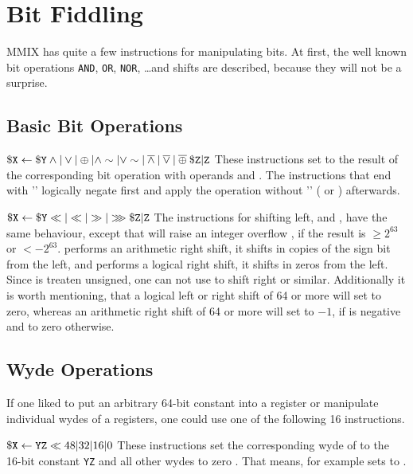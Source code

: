 \section{Bit Fiddling}

MMIX has quite a few instructions for manipulating bits. At first, the well known bit operations {\tt AND}, {\tt OR}, {\tt NOR}, \dots and shifts are described, because they will not be a surprise.

\subsection{Basic Bit Operations}

\instrtbl
	{}
	{${\tt \$X} \leftarrow {\tt \$Y} \land|\lor|\oplus|\land \sim|\lor \sim|\mathbin{\overline\land}|\mathbin{\overline\lor}|\mathbin{\overline\oplus} {\tt \$Z}{\tt|Z}$}
\noindent These instructions set  to the result of the corresponding bit operation with operands  and . The instructions that end with '' logically negate  first and apply the operation without '' ( or ) afterwards. \citep[pg. 7]{mmix-doc}

\instrtbl
	{}
	{${\tt \$X} \leftarrow {\tt \$Y} \ll|\ll|\gg|\ggg {\tt \$Z}{\tt|Z}$}
\noindent The instructions for shifting left,  and , have the same behaviour, except that  will raise an integer overflow , if the result is $\ge 2^{63}$ or $< -2^{63}$.  performs an arithmetic right shift, \ie it shifts in copies of the sign bit from the left, and  performs a logical right shift, \ie it shifts in zeros from the left. Since  is treaten unsigned, one can not use  to shift right or similar. Additionally it is worth mentioning, that a logical left or right shift of 64 or more will set  to zero, whereas an arithmetic right shift of 64 or more will set  to $-1$, if  is negative and to zero otherwise. \citep[pg. 10]{mmix-doc}

\subsection{Wyde Operations}

If one liked to put an arbitrary 64-bit constant into a register or manipulate individual wydes of a registers, one could use one of the following 16 instructions.

\instrtbl
	{}
	{${\tt \$X} \leftarrow {\tt YZ} \ll 48|32|16|0$}
\noindent These instructions set the corresponding wyde of  to the 16-bit constant {\tt YZ} and all other wydes to zero \citep[pg. 7]{mmix-doc}. That means, for example  sets  to .

